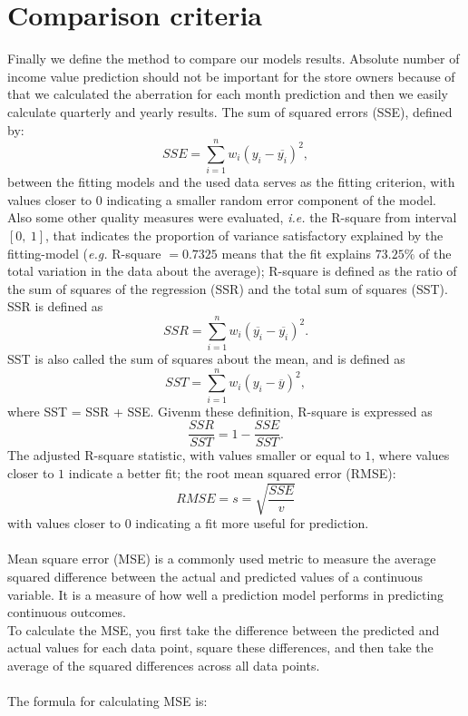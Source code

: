     \section{Comparison criteria} \label{subsec:comparison}
    Finally we define the method to compare our models results.
    Absolute number of income value prediction should not be important for the store owners because of that we calculated the aberration for each month
    prediction and then we easily calculate quarterly and yearly results.
    The sum of squared errors (SSE), defined by:
    $$SSE = \sum^n_{i=1}w_i(y_i - \overline{y_i})^2,$$
    between the fitting models and the used data serves as the fitting criterion,
    with values closer to $0$ indicating a smaller random error component of the model.
    Also some other quality measures were evaluated, \textit{i.e.} the R-square from interval $[0,\ 1]$,
    that indicates the proportion of variance satisfactory explained by the fitting-model (\textit{e.g.}  R-square $= 0.7325$ means
    that the fit explains $73.25\%$ of the total variation in the data about the average);
    R-square is defined as the ratio of the sum of squares of the regression (SSR) and the total sum of squares (SST).
    SSR is defined as
    $$SSR = \sum_{i=1}^nw_i(\overline{y_i} - \overline{y_i})^2.$$
    SST is also called the sum of squares about the mean, and is defined as
    $$SST = \sum_{i=1}^nw_i(y_i - \overline{y})^2,$$
    where SST = SSR + SSE. Givenm these definition, R-square is expressed as
    $$\frac{SSR}{SST} = 1 - \frac{SSE}{SST}.$$
    The adjusted R-square statistic, with values smaller or equal to $1$, where values closer to $1$ indicate a better fit; the root mean squared error (RMSE):\\
    $$RMSE = s = \sqrt{\frac{SSE}{v}}$$
    with values closer to $0$ indicating a fit more useful for prediction.\\
    \\
    Mean square error (MSE) is a commonly used metric to measure the average squared difference between the actual and predicted values of a continuous variable.
    It is a measure of how well a prediction model performs in predicting continuous outcomes.\\
    To calculate the MSE, you first take the difference between the predicted and actual values for each data point, square these differences, and then take the
    average of the squared differences across all data points.\\
    \\
    The formula for calculating MSE is:

